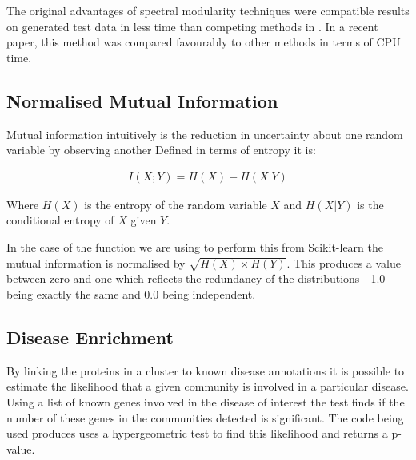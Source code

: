 The original advantages of spectral modularity techniques were compatible results on generated test data in less time than competing methods in \textcite{newman_modularity_2006}.
In a recent paper, this method was compared favourably to other methods in terms of CPU time\autocite{mcleanunpub}.


\subsection{Normalised Mutual Information}

Mutual information intuitively is the reduction in uncertainty about one random variable by observing another
Defined in terms of entropy it is\autocite{mackay_information_2003}:

\begin{align}
    I(X;Y) = H(X) - H(X|Y)
\end{align}

Where $H(X)$ is the entropy of the random variable $X$ and $H(X|Y)$ is the conditional entropy of $X$ given $Y$.

In the case of the function we are using to perform this from Scikit-learn the mutual information is normalised by $\sqrt{H(X)\times H(Y)}$\autocite{pedregosa_scikit-learn:_2011}.
This produces a value between zero and one which reflects the redundancy of the distributions - 1.0 being exactly the same and 0.0 being independent.

\subsection{Disease Enrichment}
\label{diseaseenrichment}

By linking the proteins in a cluster to known disease annotations it is possible to estimate the likelihood that a given community is involved in a particular disease.
Using a list of known genes involved in the disease of interest the test finds if the number of these genes in the communities detected is significant.
The code being used produces uses a hypergeometric test to find this likelihood and returns a p-value.

